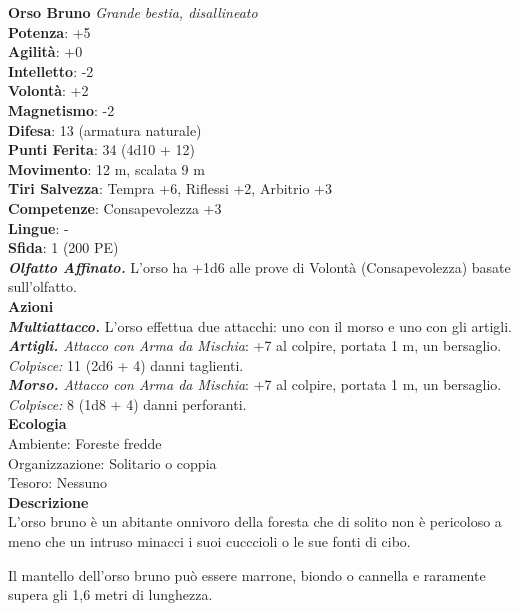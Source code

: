 \begin{multicols}{2}
\medskip\textbf{Orso Bruno}
\emph{Grande bestia, disallineato}\\
\textbf{Potenza}: +5\\
\textbf{Agilità}: +0\\
\textbf{Intelletto}: -2\\
\textbf{Volontà}: +2\\
\textbf{Magnetismo}: -2\\
\textbf{Difesa}: 13 (armatura naturale)\\
\textbf{Punti Ferita}: 34 (4d10 + 12)\\
\textbf{Movimento}: 12 m, scalata 9 m\\
\textbf{Tiri Salvezza}: Tempra +6, Riflessi +2, Arbitrio +3 \\
\textbf{Competenze}: Consapevolezza +3\\
\textbf{Lingue}: -\\
\textbf{Sfida}: 1 (200 PE)\smallskip\\
\emph{\textbf{Olfatto Affinato.}} L'orso ha +1d6 alle prove di Volontà (Consapevolezza) basate sull'olfatto.\\
\smallskip\textbf{Azioni}\\
\emph{\textbf{Multiattacco.}} L'orso effettua due attacchi: uno con il morso e uno con gli artigli.\\
\emph{\textbf{Artigli.} Attacco con Arma da Mischia}: +7 al colpire, portata 1 m, un bersaglio.\\
\emph{Colpisce:} 11 (2d6 + 4) danni taglienti.\\
\emph{\textbf{Morso.} Attacco con Arma da Mischia}: +7 al colpire, portata 1 m, un bersaglio.\\
\emph{Colpisce:} 8 (1d8 + 4) danni perforanti.\\
\textbf{Ecologia}\\
Ambiente: Foreste fredde\\
Organizzazione: Solitario o coppia\\
Tesoro: Nessuno\\
\textbf{Descrizione}\\

L'orso bruno è un abitante onnivoro della foresta che di solito non è pericoloso a meno che un intruso minacci i suoi cucccioli o le sue fonti di cibo.

Il mantello dell'orso bruno può essere marrone, biondo o cannella e raramente supera gli 1,6 metri di lunghezza. 


\end{multicols}
